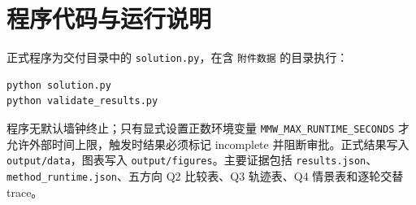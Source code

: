 \appendix
\section{程序代码与运行说明}
正式程序为交付目录中的 \texttt{solution.py}，在含 \texttt{附件数据} 的目录执行：
\begin{verbatim}
python solution.py
python validate_results.py
\end{verbatim}
程序无默认墙钟终止；只有显式设置正数环境变量 \texttt{MMW\_MAX\_RUNTIME\_SECONDS} 才允许外部时间上限，触发时结果必须标记 incomplete 并阻断审批。正式结果写入 \texttt{output/data}，图表写入 \texttt{output/figures}。主要证据包括 \texttt{results.json}、\texttt{method\_runtime.json}、五方向 Q2 比较表、Q3 轨迹表、Q4 情景表和逐轮交替 trace。
